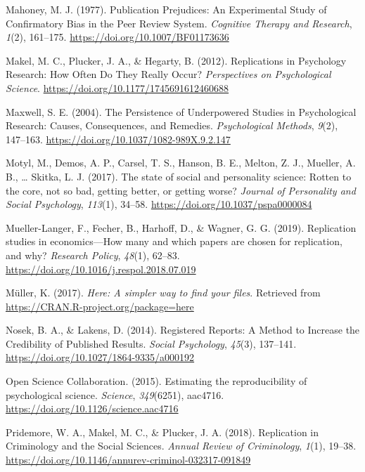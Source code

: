 \documentclass[british,,jou,floatsintext]{apa6}
\begin{document}
\leavevmode\hypertarget{ref-Mahoney1977}{}%
Mahoney, M. J. (1977). Publication Prejudices: An Experimental Study of Confirmatory Bias in the Peer Review System. \emph{Cognitive Therapy and Research}, \emph{1}(2), 161--175. \url{https://doi.org/10.1007/BF01173636}

\leavevmode\hypertarget{ref-Makel2012}{}%
Makel, M. C., Plucker, J. A., \& Hegarty, B. (2012). Replications in Psychology Research: How Often Do They Really Occur? \emph{Perspectives on Psychological Science}. \url{https://doi.org/10.1177/1745691612460688}

\leavevmode\hypertarget{ref-Maxwell2004}{}%
Maxwell, S. E. (2004). The Persistence of Underpowered Studies in Psychological Research: Causes, Consequences, and Remedies. \emph{Psychological Methods}, \emph{9}(2), 147--163. \url{https://doi.org/10.1037/1082-989X.9.2.147}

\leavevmode\hypertarget{ref-Motyl2017}{}%
Motyl, M., Demos, A. P., Carsel, T. S., Hanson, B. E., Melton, Z. J., Mueller, A. B., \ldots{} Skitka, L. J. (2017). The state of social and personality science: Rotten to the core, not so bad, getting better, or getting worse? \emph{Journal of Personality and Social Psychology}, \emph{113}(1), 34--58. \url{https://doi.org/10.1037/pspa0000084}

\leavevmode\hypertarget{ref-Mueller-Langer2019}{}%
Mueller-Langer, F., Fecher, B., Harhoff, D., \& Wagner, G. G. (2019). Replication studies in economics---How many and which papers are chosen for replication, and why? \emph{Research Policy}, \emph{48}(1), 62--83. \url{https://doi.org/10.1016/j.respol.2018.07.019}

\leavevmode\hypertarget{ref-R-here}{}%
Müller, K. (2017). \emph{Here: A simpler way to find your files}. Retrieved from \url{https://CRAN.R-project.org/package=here}

\leavevmode\hypertarget{ref-Nosek2014}{}%
Nosek, B. A., \& Lakens, D. (2014). Registered Reports: A Method to Increase the Credibility of Published Results. \emph{Social Psychology}, \emph{45}(3), 137--141. \url{https://doi.org/10.1027/1864-9335/a000192}

\leavevmode\hypertarget{ref-OSC2015}{}%
Open Science Collaboration. (2015). Estimating the reproducibility of psychological science. \emph{Science}, \emph{349}(6251), aac4716. \url{https://doi.org/10.1126/science.aac4716}

\leavevmode\hypertarget{ref-Pridemore2018}{}%
Pridemore, W. A., Makel, M. C., \& Plucker, J. A. (2018). Replication in Criminology and the Social Sciences. \emph{Annual Review of Criminology}, \emph{1}(1), 19--38. \url{https://doi.org/10.1146/annurev-criminol-032317-091849}
\end{document}
